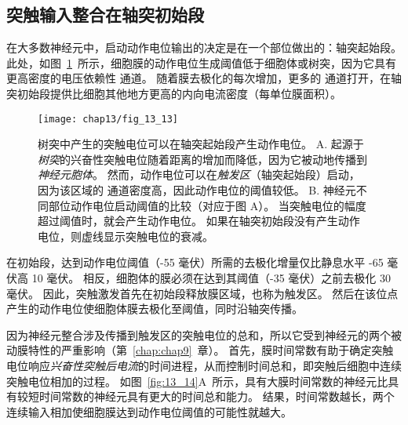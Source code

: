 \subsection{突触输入整合在轴突初始段}

在大多数神经元中，启动动作电位输出的决定是在一个部位做出的：轴突起始段。
此处，如图~\ref{fig:13_13}~所示，细胞膜的动作电位生成阈值低于细胞体或树突，因为它具有更高密度的电压依赖性  通道。
随着膜去极化的每次增加，更多的  通道打开，在轴突初始段提供比细胞其他地方更高的内向电流密度（每单位膜面积）。


\begin{figure}[htbp]
	\centering
	\texttt{[image: chap13/fig\_13\_13]}
	\caption{树突中产生的突触电位可以在轴突起始段产生动作电位\cite{eckert1988propagation}。
		A. 起源于\textit{树突}的兴奋性突触电位随着距离的增加而降低，因为它被动地传播到\textit{神经元胞体}。
		然而，动作电位可以在\textit{触发区}（轴突起始段）启动，因为该区域的  通道密度高，因此动作电位的阈值较低。
		B. 神经元不同部位动作电位启动阈值的比较（对应于图 A）。
		当突触电位的幅度超过阈值时，就会产生动作电位。
		如果在轴突初始段没有产生动作电位，则虚线显示突触电位的衰减。}
	\label{fig:13_13}
\end{figure}


在初始段，达到动作电位阈值（-55 毫伏）所需的去极化增量仅比静息水平 -65 毫伏高 10 毫伏。
相反，细胞体的膜必须在达到其阈值（-35 毫伏）之前去极化 30 毫伏。
因此，突触激发首先在初始段释放膜区域，也称为触发区。
然后在该位点产生的动作电位使细胞体膜去极化至阈值，同时沿轴突传播。


因为神经元整合涉及传播到触发区的突触电位的总和，所以它受到神经元的两个被动膜特性的严重影响（第~\ref{chap:chap9}~章）。
首先，膜时间常数有助于确定突触电位响应\textit{兴奋性突触后电流}的时间进程，从而控制时间总和，即突触后细胞中连续突触电位相加的过程。
如图~\ref{fig:13_14}A~所示，具有大膜时间常数的神经元比具有较短时间常数的神经元具有更大的时间总和能力。
结果，时间常数越长，两个连续输入相加使细胞膜达到动作电位阈值的可能性就越大。


